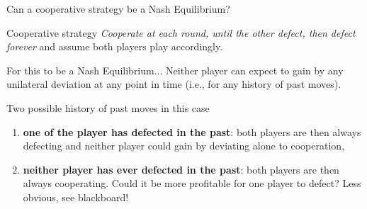 \begin{frame}{Can a cooperative strategy be a Nash Equilibrium?}
    \begin{block}{Cooperative strategy}
        \textit{Cooperate at each round, until the other defect,
        then defect forever} and assume both players play accordingly.
    \end{block}

    \begin{exampleblock}{For this to be a Nash Equilibrium...}
        Neither player can expect to gain by any unilateral deviation at any point
        in time (i.e., for any history of past moves).
        
        Two possible history of past moves in this case
        \begin{enumerate}
            \pause
            \item \textbf{one of the player has defected in the past}: both players are then always defecting
            and neither player could gain by deviating alone to cooperation, \pause
            \item \textbf{neither player has ever defected in the past}: both players are then always
            cooperating.
            Could it be more profitable for one player to defect? Less obvious, see blackboard!
        \end{enumerate}
    \end{exampleblock}
\end{frame}
    


